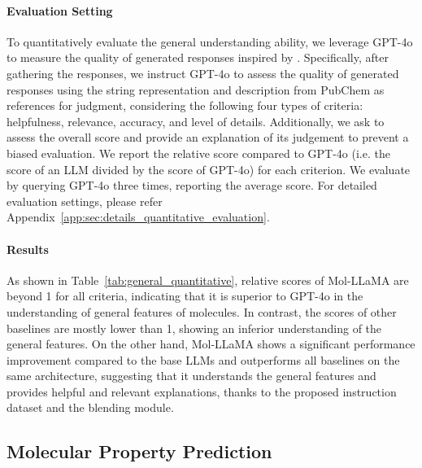 \paragraph{Evaluation Setting}
To quantitatively evaluate the general understanding ability, we leverage GPT-4o to measure the quality of generated responses inspired by \citet{liu2024LLAVA}. Specifically, after gathering the responses, we instruct GPT-4o to assess the quality of generated responses using the string representation and description from PubChem as references for judgment, considering the following four types of criteria: helpfulness, relevance, accuracy, and level of details. Additionally, we ask to assess the overall score and provide an explanation of its judgement to prevent a biased evaluation. We report the relative score compared to GPT-4o (i.e. the score of an LLM divided by the score of GPT-4o) for each criterion. We evaluate by querying GPT-4o three times, reporting the average score. For detailed evaluation settings, please refer Appendix~\ref{app:sec:details_quantitative_evaluation}.

\vspace{-0.08in}
\paragraph{Results} As shown in Table~\ref{tab:general_quantitative}, relative scores of Mol-LLaMA are beyond 1 for all criteria, indicating that it is superior to GPT-4o in the understanding of general features of molecules. In contrast, the scores of other baselines are mostly lower than 1, showing an inferior understanding of the general features. On the other hand, Mol-LLaMA shows a significant performance improvement compared to the base LLMs and outperforms all baselines on the same architecture, suggesting that it understands the general features and provides helpful and relevant explanations, thanks to the proposed instruction dataset and the blending module.

\vspace{-0.05in}
\subsection{Molecular Property Prediction}
\vspace{-0.05in}
